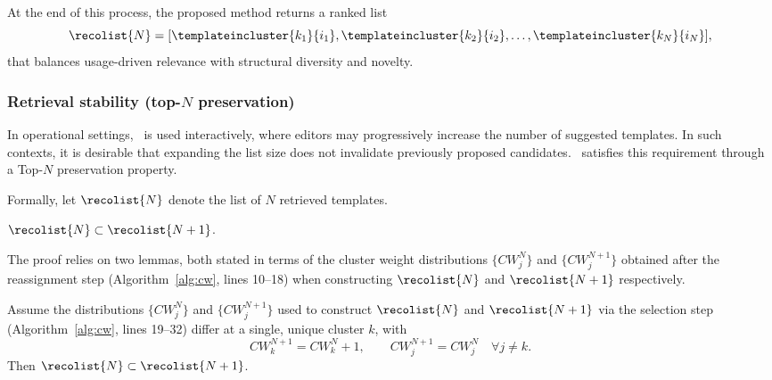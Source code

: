 At the end of this process, the proposed method returns a ranked list
\[
\recolist{N} = [\templateincluster{k_1}{i_1}, \templateincluster{k_2}{i_2}, \dots, \templateincluster{k_N}{i_N}],
\]
that balances usage-driven relevance with structural diversity and novelty.

\subsubsection{Retrieval stability (top-$N$ preservation)}
\label{sec:discussion:preservation}

In operational settings, \trs\ is used interactively, where editors may progressively increase the number of suggested templates. In such contexts, it is desirable that expanding the list size does not invalidate previously proposed candidates. \trs\ satisfies this requirement through a Top-$N$ preservation property.

Formally, let $\recolist{N}$ denote the list of $N$ retrieved templates.

\begin{proposition}
\label{proposition:trs}
$\recolist{N} \subset \recolist{N+1}$.
\end{proposition}

The proof relies on two lemmas, both stated in terms of the cluster weight distributions $\{CW_j^{N}\}$ and $\{CW_j^{N+1}\}$ obtained after the reassignment step (Algorithm~\ref{alg:cw}, lines 10--18) when constructing $\recolist{N}$ and $\recolist{N+1}$ respectively.

\begin{lemma}
\label{lemma:cw-selection}
Assume the distributions $\{CW_j^{N}\}$ and $\{CW_j^{N+1}\}$ used to construct $\recolist{N}$ and $\recolist{N+1}$ via the selection step (Algorithm~\ref{alg:cw}, lines 19--32) differ at a single, unique cluster $k$, with
\begin{equation}
CW_{k}^{N+1} = CW_{k}^{N} + 1, \qquad CW_j^{N+1} = CW_j^{N} \quad \forall j \neq k.
\label{eq:cw-unit-increment}
\end{equation}
Then $\recolist{N} \subset \recolist{N+1}$.
\end{lemma}

